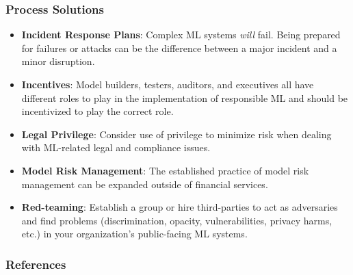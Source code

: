 \documentclass[11pt,
               aspectratio=169,
               hyperref={colorlinks}
               ]{beamer}
\begin{document}
		\begin{frame}
			
			\frametitle{Process Solutions}	
				
			\begin{itemize}
				
				\item \textbf{Incident Response Plans}: Complex ML systems \textit{will} fail. Being prepared for failures or attacks can be the difference between a major incident and a minor disruption.
				
				\item \textbf{Incentives}: Model builders, testers, auditors, and executives all have different roles to play in the implementation of responsible ML and should be incentivized to play the correct role.
				
				\item \textbf{Legal Privilege}: Consider use of privilege to minimize risk when dealing with ML-related legal and compliance issues.
				
				\item \textbf{Model Risk Management}: The established practice of model risk management can be expanded outside of financial services.
				
				\item \textbf{Red-teaming}: Establish a group or hire third-parties to act as adversaries and find problems (discrimination, opacity, vulnerabilities, privacy harms, etc.) in your organization's public-facing ML systems.
				
			\end{itemize}
			
		\end{frame}	




			


	\begin{frame}[t, allowframebreaks]
	
		\frametitle{References}	
				
		\printbibliography
		
	\end{frame}
\end{document}

